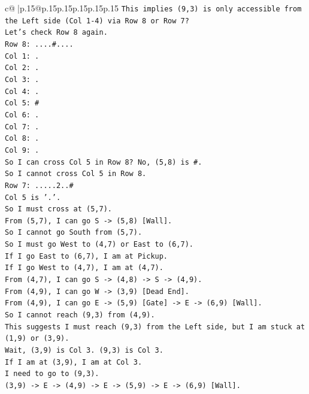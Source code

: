 \documentclass{article}
\begin{document}
{\begin{supertabular}{c@{$\;$}|p{.15\linewidth}@{}p{.15\linewidth}p{.15\linewidth}p{.15\linewidth}p{.15\linewidth}p{.15\linewidth}}
{{{\texttt{This implies (9,3) is only accessible from the Left side (Col 1{-}4) via Row 8 or Row 7?} \\
\texttt{Let's check Row 8 again.} \\
\texttt{Row 8: ....\#....} \\
\texttt{Col 1: .} \\
\texttt{Col 2: .} \\
\texttt{Col 3: .} \\
\texttt{Col 4: .} \\
\texttt{Col 5: \#} \\
\texttt{Col 6: .} \\
\texttt{Col 7: .} \\
\texttt{Col 8: .} \\
\texttt{Col 9: .} \\
\texttt{So I can cross Col 5 in Row 8? No, (5,8) is \#.} \\
\texttt{So I cannot cross Col 5 in Row 8.} \\
\texttt{Row 7: .....2..\#} \\
\texttt{Col 5 is '.'.} \\
\texttt{So I must cross at (5,7).} \\
\texttt{From (5,7), I can go S {-}> (5,8) {[}Wall{]}.} \\
\texttt{So I cannot go South from (5,7).} \\
\texttt{So I must go West to (4,7) or East to (6,7).} \\
\texttt{If I go East to (6,7), I am at Pickup.} \\
\texttt{If I go West to (4,7), I am at (4,7).} \\
\texttt{From (4,7), I can go S {-}> (4,8) {-}> S {-}> (4,9).} \\
\texttt{From (4,9), I can go W {-}> (3,9) {[}Dead End{]}.} \\
\texttt{From (4,9), I can go E {-}> (5,9) {[}Gate{]} {-}> E {-}> (6,9) {[}Wall{]}.} \\
\texttt{So I cannot reach (9,3) from (4,9).} \\
\texttt{This suggests I must reach (9,3) from the Left side, but I am stuck at (1,9) or (3,9).} \\
\texttt{Wait, (3,9) is Col 3. (9,3) is Col 3.} \\
\texttt{If I am at (3,9), I am at Col 3.} \\
\texttt{I need to go to (9,3).} \\
\texttt{(3,9) {-}> E {-}> (4,9) {-}> E {-}> (5,9) {-}> E {-}> (6,9) {[}Wall{]}.} \\
}}}
\end{supertabular}}
\end{document}
